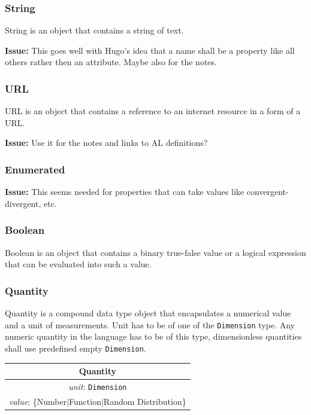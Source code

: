 \documentclass{article}
\newcommand{\issue}[1]{%
\begin{center}
\colorbox{issuecolor}{\parbox{0.8\linewidth}{\textbf{Issue:} #1}}
\end{center}%
}
\begin{document}
\subsubsection{String}

String is an object that contains a string of text.

\issue{This goes well with Hugo's idea that a name shall be a property like
all others rather then an attribute. Maybe also for the notes.}

\subsubsection{URL}

URL is an object that contains a reference to an internet resource in a form
of a URL.

\issue{Use it for the notes and links to AL definitions?}

\subsubsection{Enumerated}

\issue{This seems needed for properties that can take values like
convergent-divergent, etc.}

\subsubsection{Boolean}

Boolean is an object that contains a binary true-false value or a logical
expression that can be evaluated into such a value.

\subsubsection{Quantity}

Quantity is a compound data type object that encapsulates a numerical value
and a unit of measurements. Unit has to be of one of the {\tt Dimension} type.
Any numeric quantity in the language has to be of this type,
dimensionless quantities shall use predefined empty {\tt Dimension}.

\begin{table}[htb]
\center
\begin{tabular}{|c|}
\hline
\hline
Quantity \\
\hline
\hline
{\em unit}: {\tt Dimension} \\
\hline
{\em value}: \{Number$|$Function$|$Random Distribution\} \\
\hline
\end{tabular}
\end{table}
\end{document}
